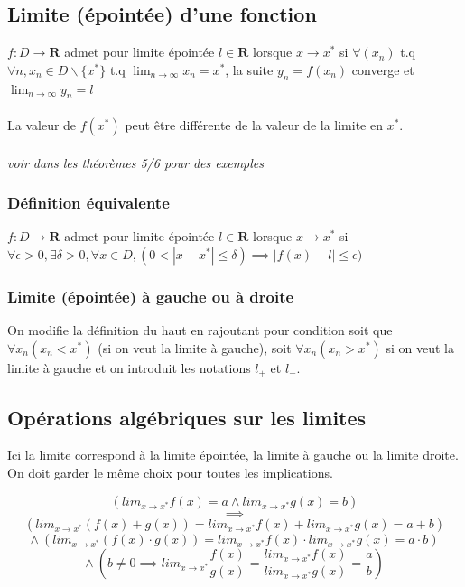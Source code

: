 \documentclass{article}
\begin{document}
\subsection{Limite (épointée) d'une fonction}

$ f : D \to \mathbf{R} $ admet pour limite épointée $ l \in \mathbf{R} $ lorsque $ x \to x^* $ si $ \forall (x_n) $ t.q $ \forall n, x_n \in D \backslash \{x^*\} $ t.q $ \lim_{n\to\infty} x_n = x^*$, la suite $ y_n = f(x_n) $ converge et $ \lim_{n\to\infty} y_n = l$\\\\
La valeur de $ f(x^*) $ peut être différente de la valeur de la limite en $ x^* $.\\\\
\textit{voir dans les théorèmes 5/6 pour des exemples}

\subsubsection{Définition équivalente}

$ f : D \to \mathbf{R} $ admet pour limite épointée $ l \in \mathbf{R} $ lorsque $ x \to x^* $ si $ \forall \epsilon > 0, \exists \delta > 0, \forall x \in D, (0 < |x-x^*| \leq \delta) \implies |f(x) - l| \leq \epsilon)$

\subsubsection{Limite (épointée) à gauche ou à droite}

On modifie la définition du haut en rajoutant pour condition soit que $ \forall x_n (x_n < x^*) $ (si on veut la limite à gauche), soit $ \forall x_n (x_n > x^*)$ si on veut la limite à gauche et on introduit les notations $ l_+ $ et $ l_-$.

\subsection{Opérations algébriques sur les limites}

Ici la limite correspond à la limite épointée, la limite à gauche ou la limite droite. On doit garder le même choix pour toutes les implications.

\[ (lim_{x\to{x^*}} f(x) = a \wedge lim_{x\to{x^*}} g(x) = b) \]
\[ \implies \]
\[ (lim_{x\to{x^*}} (f(x) + g(x)) = lim_{x\to{x^*}} f(x) + lim_{x\to{x^*}} g(x) = a + b) \]
\[ \wedge\ (lim_{x\to{x^*}} (f(x) \cdot g(x)) = lim_{x\to{x^*}} f(x) \cdot lim_{x\to{x^*}} g(x) = a \cdot b) \]
\[ \wedge\ (b \neq 0 \implies lim_{x\to{x^*}} \frac{f(x)}{g(x)} = \frac{lim_{x\to{x^*}} f(x)}{lim_{x\to{x^*}} g(x)} = \frac{a}{b}) \]
\end{document}
